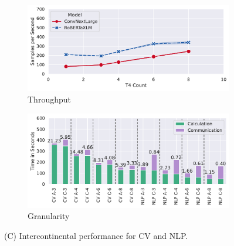 \begin{figure}
    \begin{subfigure}[c]{0.25\textwidth}
        \includegraphics[width=\textwidth]{figures/misc/geo-distributed-performance-US-EU-ASIA-AUS}
        \vspace{-15pt}
        \caption{Throughput}
        \label{fig:geo-dist-us-eu-asia-aus-throughput}
    \end{subfigure}
    \begin{subfigure}[c]{0.22\textwidth}
        \includegraphics[width=\textwidth]{figures/misc/geo-distributed-performance-US-EU-ASIA-AUS-granularity}  
        \vspace{-15pt}
        \caption{Granularity}
        \label{fig:geo-dist-us-eu-asia-aus-granularity}
    \end{subfigure}
    \vspace{-10pt}
    \caption{(C) Intercontinental performance for CV and NLP.}
    \label{fig:geo-dist-us-eu-asia-oce}
    \vspace*{-7mm}
\end{figure} 

